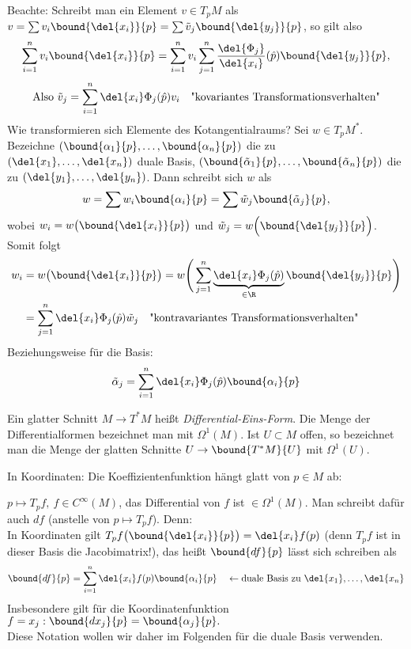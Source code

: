 \begin{rem}\label{3.22}
	Beachte: Schreibt man ein Element $v \in T_pM$ als $ v = \sum v_i \bound{\del{x_i}}{p} = \sum \tilde{v}_j \bound{\del{y_j}}{p} $, so gilt also
	\[ \sum_{i=1}^{n} v_i \bound{\del{x_i}}{p} = \sum_{i=1}^{n} v_i \sum_{j=1}^n \frac{\del{\Phi_j}}{\del{x_i}}(\hat{p}) \bound{\del{y_j}}{p}, \]
	\[ \text{Also } \tilde{v}_j = \sum_{i=1}^n \del{x_i} \Phi_j(\hat{p}) v_i\quad \text{"kovariantes Transformationsverhalten"} \]
	Wie transformieren sich Elemente des Kotangentialraums? Sei $w \in T_pM^*$. Bezeichne $ (\bound{\alpha_1}{p},\dotsc, \bound{\alpha_n}{p}) $ die zu $ (\del{x_1},\dotsc, \del{x_n}) $ duale Basis, $ (\bound{\tilde{\alpha}_1}{p},\dotsc, \bound{\tilde{\alpha}_n}{p}) $ die zu $ (\del{y_1},\dotsc, \del{y_n}) $. Dann schreibt sich $w$ als 
	\[ w = \sum w_i \bound{\alpha_i}{p} = \sum \tilde{w}_j \bound{\tilde{\alpha}_j}{p}, \]
	wobei $w_i = w \big( \bound{\del{x_i}}{p} \big)$ und $\tilde{w}_j = w \Big( \bound{\del{y_j}}{p} \Big)$. Somit folgt
	\begin{align*}
		w_i &= w \big( \bound{\del{x_i}}{p} \big) = w \Bigg( \sum_{j=1}^n \underbrace{\del{x_i} \Phi_j(\hat{p})}_{\in \R} \bound{\del{y_j}}{p} \Bigg)\\
		&= \sum_{j=1}^n \del{x_i} \Phi_j(\hat{p}) \tilde{w}_j\quad \text{"kontravariantes Transformationsverhalten"}
	\end{align*}
	Beziehungsweise für die Basis:
	\[ \tilde{\alpha}_j = \sum_{i=1}^n \del{x_i}\Phi_j (\hat{p}) \bound{\alpha_i}{p} \]
\end{rem}
\addtocounter{thm}{1}
\begin{defn}
	Ein glatter Schnitt $M \to T^*M$ heißt \emph{Differential-Eins-Form}. Die Menge der Differentialformen bezeichnet man mit $\Omega^1(M)$. Ist $U \subset M$ offen, so bezeichnet man die Menge der glatten Schnitte $ U \to \bound{T^*M}{U} $ mit $\Omega^1(U)$.
\end{defn}

In Koordinaten: Die Koeffizientenfunktion hängt glatt von $p \in M$ ab:

\begin{exmp*}
	$p \mapsto T_pf,\ f \in C^\infty(M)$, das Differential von $f$ ist $\in \Omega^1(M)$. Man schreibt dafür auch $df$ (anstelle von $p \mapsto T_pf$). Denn:\\
	In Koordinaten gilt $ T_pf \big( \bound{\del{x_i}}{p} \big) = \del{x_i} f(p) $ (denn $T_pf$ ist in dieser Basis die Jacobimatrix!), das heißt $\bound{df}{p}$ lässt sich schreiben als
	\[ \bound{df}{p} = \sum_{i=1}^n \del{x_i} f(p) \bound{\alpha_i}{p} \quad \leftarrow \text{duale Basis zu }\del{x_1},\dotsc, \del{x_n} \]
	Insbesondere gilt für die Koordinatenfunktion $ f = x_j: \bound{dx_j}{p} = \bound{\alpha_j}{p}. $\\
	Diese Notation wollen wir daher im Folgenden für die duale Basis verwenden.
\end{exmp*}

